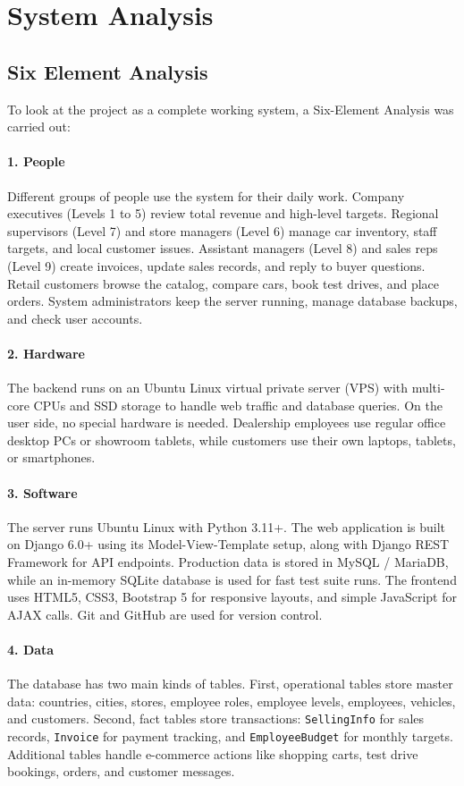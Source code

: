 \section{System Analysis}

\subsection{Six Element Analysis}
To look at the project as a complete working system, a Six-Element Analysis was carried out:

\paragraph{1. People}
Different groups of people use the system for their daily work. Company executives (Levels 1 to 5) review total revenue and high-level targets. Regional supervisors (Level 7) and store managers (Level 6) manage car inventory, staff targets, and local customer issues. Assistant managers (Level 8) and sales reps (Level 9) create invoices, update sales records, and reply to buyer questions. Retail customers browse the catalog, compare cars, book test drives, and place orders. System administrators keep the server running, manage database backups, and check user accounts.

\paragraph{2. Hardware}
The backend runs on an Ubuntu Linux virtual private server (VPS) with multi-core CPUs and SSD storage to handle web traffic and database queries. On the user side, no special hardware is needed. Dealership employees use regular office desktop PCs or showroom tablets, while customers use their own laptops, tablets, or smartphones.

\paragraph{3. Software}
The server runs Ubuntu Linux with Python 3.11+. The web application is built on Django 6.0+ using its Model-View-Template setup, along with Django REST Framework for API endpoints. Production data is stored in MySQL / MariaDB, while an in-memory SQLite database is used for fast test suite runs. The frontend uses HTML5, CSS3, Bootstrap 5 for responsive layouts, and simple JavaScript for AJAX calls. Git and GitHub are used for version control.

\paragraph{4. Data}
The database has two main kinds of tables. First, operational tables store master data: countries, cities, stores, employee roles, employee levels, employees, vehicles, and customers. Second, fact tables store transactions: \texttt{SellingInfo} for sales records, \texttt{Invoice} for payment tracking, and \texttt{EmployeeBudget} for monthly targets. Additional tables handle e-commerce actions like shopping carts, test drive bookings, orders, and customer messages.

